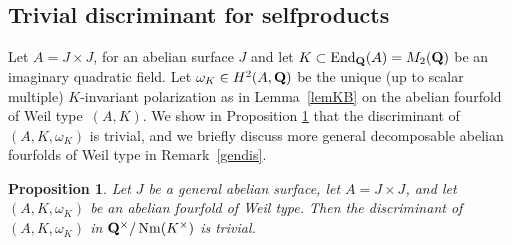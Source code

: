 \documentclass[10pt,a4paper]{amsart}
\numberwithin{equation}{section}
\newtheorem{Proposition}[Theorem]{Proposition}
 { \theoremstyle{definition}
\newtheorem{Definition}[Theorem]{Definition}
\newtheorem{Note}[Theorem]{Note}
\newtheorem{Example}[Theorem]{Example}
\newtheorem{Remark}[Theorem]{Remark} }
\begin{document}
\subsection{Trivial discriminant for selfproducts}\label{triv}
Let $A=J\times J$, for an abelian surface $J$ and let $K\subset \operatorname{End}_{\bf Q}(A)=M_2({\bf Q})$ be an
imaginary quadratic field.
Let $\omega_K\in H^2(A,{\bf Q})$ be the unique
(up to scalar multiple) $K$-invariant
polarization as in Lemma~\ref{lemKB} on the abelian fourfold of Weil type~$(A,K)$.
We show in Proposition \ref{triv dis} that the discriminant of
$(A,K,\omega_K)$ is trivial, and we briefly discuss more general decomposable
abelian fourfolds of Weil type in Remark~\ref{gendis}.

\begin{Proposition}\label{triv dis}
Let $J$ be a general abelian surface, let $A=J\times J$,
and let $(A,K,\omega_K)$ be an abelian fourfold of Weil type.
Then the discriminant of $(A,K,\omega_K)$ in ${\bf Q}^\times/\operatorname{Nm}(K^\times)$ is trivial.
\end{Proposition}
\end{document}
